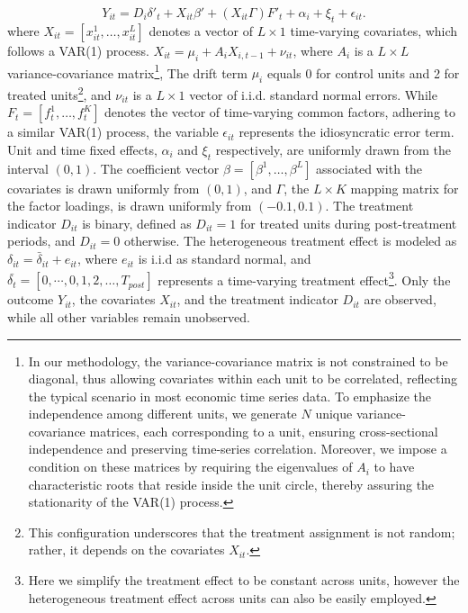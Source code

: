 \documentclass[12pt]{article}
\begin{document}
\begin{equation}
Y_{it} = D_{i} \delta'_{t} + X_{it}\beta' + (X_{it}\Gamma) F'_{t} + \alpha_i + \xi_t + \epsilon_{it}.
\label{eq: dgp}
\end{equation}
where $X_{it} = [x_{it}^1, \ldots, x_{it}^{L}]$ denotes a vector of $L \times 1$ time-varying covariates, which follows a VAR(1) process. $X_{it} = \mu_i + A_i X_{i,t-1} + \nu_{it}$, where $A_i$ is a $ L \times L$ variance-covariance matrix\footnote{In our methodology, the variance-covariance matrix is not constrained to be diagonal, thus allowing covariates within each unit to be correlated, reflecting the typical scenario in most economic time series data. To emphasize the independence among different units, we generate $N$ unique variance-covariance matrices, each corresponding to a unit, ensuring cross-sectional independence and preserving time-series correlation. Moreover, we impose a condition on these matrices by requiring the eigenvalues of $A_i$ to have characteristic roots that reside inside the unit circle, thereby assuring the stationarity of the VAR(1) process.}, The drift term $\mu_i$ equals 0 for control units and 2 for treated units\footnote{This configuration underscores that the treatment assignment is not random; rather, it depends on the covariates $X_{it}$.}, and $\nu_{it}$ is a $L \times 1$ vector of i.i.d. standard normal errors. While $F_t = [f_t^1, \ldots, f_t^K]$ denotes the vector of time-varying common factors, adhering to a similar VAR(1) process, the variable $\epsilon_{it}$ represents the idiosyncratic error term. Unit and time fixed effects, $\alpha_i$ and $\xi_{t}$ respectively, are uniformly drawn from the interval $(0,1)$. The coefficient vector $\beta = [\beta^1, \ldots, \beta^{L}]$ associated with the covariates is drawn uniformly from $(0,1)$, and $\Gamma$, the $L \times K$ mapping matrix for the factor loadings, is drawn uniformly from $(-0.1, 0.1)$. The treatment indicator $D_{it}$ is binary, defined as $D_{it} = 1$ for treated units during post-treatment periods, and $D_{it} = 0$ otherwise. The heterogeneous treatment effect is modeled as $\delta_{it} = \bar{\delta}_{it} + e_{it}$, where $e_{it}$ is i.i.d as standard normal, and $\bar{\delta_t} = [0, \cdots, 0, 1,2,\ldots,T_{post}]$ represents a time-varying treatment effect\footnote{Here we simplify the treatment effect to be constant across units, however the heterogeneous treatment effect across units can also be easily employed.}. Only the outcome $Y_{it}$, the covariates $X_{it}$, and the treatment indicator $D_{it}$ are observed, while all other variables remain unobserved.
\end{document}
